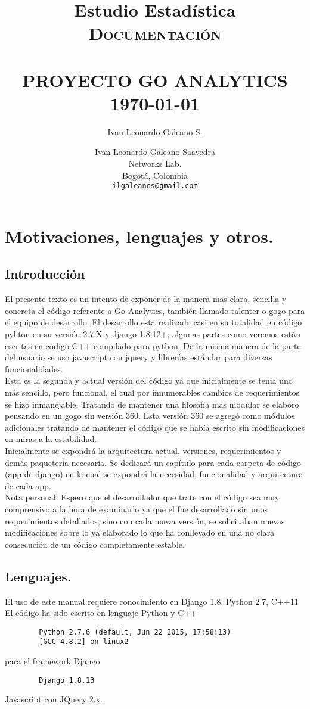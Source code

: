 \documentclass[10pt,a4paper]{book}
\author{Ivan Leonardo Galeano S.}
\title{Estudio Estadística}
\title{	\normalsize \textsc{Documentación}
	\\[2.0cm]
	\HRule{0.5pt} \\
	\LARGE \textbf{\uppercase{Proyecto Go Analytics}}
	\HRule{2pt} \\ [0.5cm]
	\normalsize \today
}
\author{
	Ivan Leonardo Galeano Saavedra\\
	Networks Lab.\\
	Bogotá, Colombia\\
	\texttt{ilgaleanos@gmail.com} \\
}
\makeatletter
\def\printtitle{
	{\centering \@title\par}}
\def\printauthor{
	{\centering \large \@author}}
\makeatother
\begin{document}
	\thispagestyle{empty}
	\printtitle
	\vfill
	\printauthor

	\tableofcontents

	\chapter{Motivaciones, lenguajes y otros.}

	\section*{Introducción}
	
	El presente texto es un intento de exponer de la manera mas clara, sencilla y concreta el código referente a Go Analytics, también llamado talenter o gogo para el equipo de desarrollo. El desarrollo esta realizado casi en su totalidad en código pyhton en su versión 2.7.X y django 1.8.12+; algunas partes como veremos están escritas en código C++ compilado para python. De la misma manera de la parte del usuario se uso javascript con jquery y librerías estándar para diversas funcionalidades.\\
	
	Esta es la segunda y actual versión del código ya que inicialmente se tenia uno más sencillo, pero funcional, el cual por innumerables cambios de requerimientos se hizo inmanejable. Tratando de mantener una filosofía mas modular se elaboró pensando en un gogo sin versión 360. Esta versión 360 se agregó como módulos adicionales tratando de mantener el código que se había escrito sin modificaciones en miras a la estabilidad.\\
	
	Inicialmente se expondrá la arquitectura actual, versiones, requerimientos y demás paquetería necesaria. Se dedicará un capítulo para cada carpeta de código (app de django) en la cual se expondrá la necesidad, funcionalidad y arquitectura de cada app.\\
	
	Nota personal: Espero que el desarrollador que trate con el código sea muy comprensivo a la hora de examinarlo ya que el fue desarrollado sin unos requerimientos detallados, sino con cada nueva versión, se solicitaban nuevas modificaciones sobre lo ya elaborado lo que ha conllevado en una no clara consecución de un código completamente estable.\\
	
	
	\section{Lenguajes.}
	El uso de este manual requiere conocimiento en Django 1.8, Python 2.7, C++11
	El código ha sido escrito en lenguaje Python y C++
	\begin{verbatim}
		Python 2.7.6 (default, Jun 22 2015, 17:58:13) 
		[GCC 4.8.2] on linux2
	\end{verbatim}
	para el framework Django 
	\begin{verbatim}
		Django 1.8.13
	\end{verbatim}
	Javascript con JQuery 2.x.
	
\end{document}
